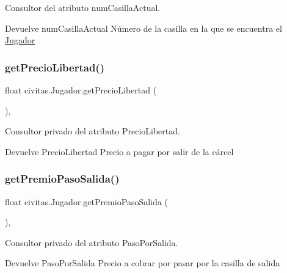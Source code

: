 Consultor del atributo num\+Casilla\+Actual. \begin{DoxyReturn}{Devuelve}
num\+Casilla\+Actual Número de la casilla en la que se encuentra el \hyperlink{classcivitas_1_1Jugador}{Jugador} 
\end{DoxyReturn}
\mbox{\label{classcivitas_1_1Jugador_a7efefdcbd0fc0d10e113a605c0251e2b}} 
\subsubsection{\texorpdfstring{get\+Precio\+Libertad()}{getPrecioLibertad()}}
{\footnotesize\ttfamily float civitas.\+Jugador.\+get\+Precio\+Libertad (\begin{DoxyParamCaption}{ }\end{DoxyParamCaption})\hspace{0.3cm}{\ttfamily [inline]}, {\ttfamily [private]}}

Consultor privado del atributo Precio\+Libertad. \begin{DoxyReturn}{Devuelve}
Precio\+Libertad Precio a pagar por salir de la cárcel 
\end{DoxyReturn}
\mbox{\label{classcivitas_1_1Jugador_a2640c1b6ddf6f07a2d11012b51f05910}} 
\subsubsection{\texorpdfstring{get\+Premio\+Paso\+Salida()}{getPremioPasoSalida()}}
{\footnotesize\ttfamily float civitas.\+Jugador.\+get\+Premio\+Paso\+Salida (\begin{DoxyParamCaption}{ }\end{DoxyParamCaption})\hspace{0.3cm}{\ttfamily [inline]}, {\ttfamily [private]}}

Consultor privado del atributo Paso\+Por\+Salida. \begin{DoxyReturn}{Devuelve}
Paso\+Por\+Salida Precio a cobrar por pasar por la casilla de salida 
\end{DoxyReturn}
\mbox{\label{classcivitas_1_1Jugador_a2927df4695696abd841c71f6c3eba318}} 
